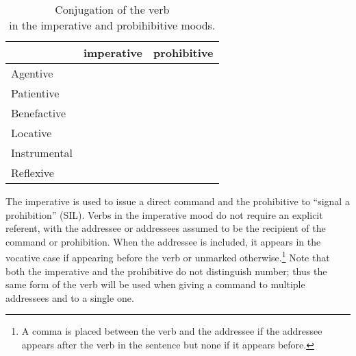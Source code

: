\begin{table}[h!]
\sffamily\footnotesize
	\caption{Conjugation of the verb \\ in the imperative and probihibitive moods.}
	\label{tbl:imperative}

    \begin{tabu}to 0.7\textwidth{YYY}
         \toprule

         &{\sc imperative}&{\sc prohibitive}  \\
         \midrule

         Agentive &
          &
         \\

         Patientive &
          &
         \\

         Benefactive &
          &
         \\

         Locative &
          &
         \\

         Instrumental &
          &
         \\

         Reflexive &
          &
         \\

         \bottomrule
    \end{tabu}

\end{table}

The imperative is used to issue a direct command and the prohibitive to ``signal a prohibition'' (SIL). Verbs in the imperative mood do not require an explicit referent, with the addressee or addressees assumed to be the recipient of the command or prohibition. When the addressee is included, it appears in the vocative case if appearing before the verb or unmarked otherwise.\footnote{A comma is placed between the verb and the addressee if the addressee appears after the verb in the sentence but none if it appears before.} Note that both the imperative and the prohibitive do not distinguish number; thus the same form of the verb will be used when giving a command to multiple addressees and to a single one.

